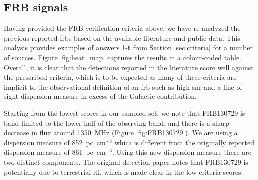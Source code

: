 \documentclass[a4paper,fleqn,usenatbib]{mnras}
\begin{document}
\subsection{FRB signals}

Having provided the FRB verification criteria above, we have re-analyzed the
previous reported \glspl{frb} based on the available literature and public data.
This analysis provides examples of answers 1-6 from Section \ref{sec:criteria}
for a number of sources. Figure \ref{fig:heat_map} captures the results in a
colour-coded table.  Overall, it is clear that the detections reported in the
literature score well against the prescribed criteria, which is to be expected
as many of these criteria are implicit to the observational definition of an
\gls{frb} such as high \gls{snr} and a line of sight dispersion measure in
excess of the Galactic contribution.

Starting from the lowest scores in our sampled set, we note that FRB130729 is
band-limited to the lower half of the observing band, and there is a sharp
decrease in flux around 1350~MHz (Figure \ref{fig:FRB130729}). We are using a
dispersion measure of 852~pc~cm$^{-3}$ which is different from the originally
reported dispersion measure of 861~pc~cm$^{-3}$. Using this new dispersion
measure there are two distinct components. The original detection paper
\citep{2016MNRAS.460L..30C} notes that FRB130729 is potentially due to
terrestrial \gls{rfi}, which is made clear in the low criteria scores.
\end{document}
